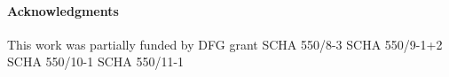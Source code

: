 \paragraph{Acknowledgments}

This work was partially funded 
by 
DFG
grant 
SCHA 550/8-3   %
SCHA 550/9-1+2   %
SCHA 550/10-1  %
SCHA 550/11-1  %


